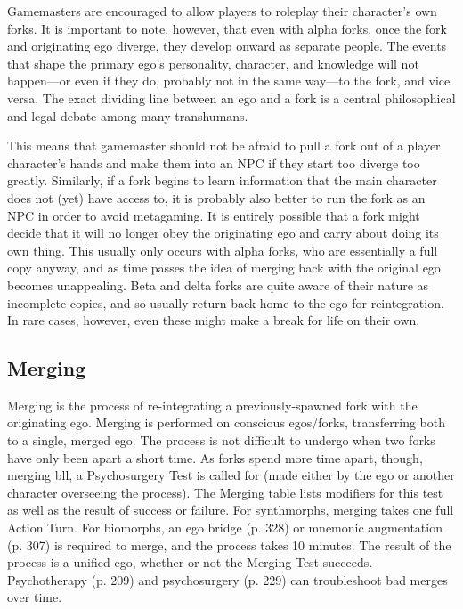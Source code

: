Gamemasters are encouraged to allow players to roleplay their character's own forks. It is important to note, however, that even with alpha forks, once the fork and originating ego diverge, they develop onward as separate people. The events that shape the primary ego's personality, character, and knowledge will not happen—or even if they do, probably not in the same way—to the fork, and vice versa. The exact dividing line between an ego and a fork is a central philosophical and legal debate among many transhumans. 

This means that gamemaster should not be afraid to pull a fork out of a player character's hands and make them into an NPC if they start too diverge too greatly. Similarly, if a fork begins to learn information that the main character does not (yet) have access to, it is probably also better to run the fork as an NPC in order to avoid metagaming. It is entirely possible that a fork might decide that it will no longer obey the originating ego and carry about doing its own thing. This usually only occurs with alpha forks, who are essentially a full copy anyway, and as time passes the idea of merging back with the original ego becomes unappealing. Beta and delta forks are quite aware of their nature as incomplete copies, and so usually return back home to the ego for reintegration. In rare cases, however, even these might make a break for life on their own. 

\subsection{Merging} 

Merging is the process of re-integrating a previously-spawned fork with the originating ego. Merging is performed on conscious egos/forks, transferring both to a single, merged ego. The process is not difficult to undergo when two forks have only been apart a short time. As forks spend more time apart, though, merging bll, a Psychosurgery Test is called for (made either by the ego or another character overseeing the process). The Merging table lists modifiers for this test as well as the result of success or failure. For synthmorphs, merging takes one full Action Turn. For biomorphs, an ego bridge (p. 328) or mnemonic augmentation (p. 307) is required to merge, and the process takes 10 minutes. The result of the process is a unified ego, whether or not the Merging Test succeeds. Psychotherapy (p. 209) and psychosurgery (p. 229) can troubleshoot bad merges over time. \\ 

